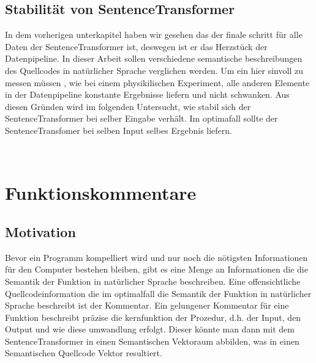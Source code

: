 \documentclass[12pt,letterpaper,ngerman]{article}
\begin{document}
\subsection{Stabilität von SentenceTransformer}
In dem vorherigen unterkapitel haben wir gesehen das der finale schritt 
für alle Daten der SentenceTransformer ist, deswegen ist er das Herzstück
der Datenpipeline. In dieser Arbeit sollen verschiedene semantische 
beschreibungen des Quellcodes in natürlicher Sprache verglichen werden.
Um ein hier sinvoll zu messen müssen , wie bei einem physikilischen Experiment,
alle anderen Elemente in der Datenpipeline konstante Ergebnisse liefern und 
nicht schwanken. Aus diesen Gründen wird im folgenden Untersucht, wie stabil
sich der SentenceTransformer bei selber Eingabe verhält. Im optimafall sollte
der SentenceTransfomer bei selben Input selbes Ergebnis liefern. 



\
\section{Funktionskommentare}
\subsection{Motivation}
Bevor ein Programm kompelliert wird und nur noch die nötigsten Informationen
für den Computer bestehen bleiben, gibt es eine Menge an Informationen die 
die Semantik der Funktion in natürlicher Sprache beschreiben. Eine offensichtliche
Quellcodeinformation die im optimalfall die Semantik der Funktion in natürlicher
Sprache beschreibt ist der Kommentar. Ein gelungener Kommentar für eine Funktion
beschreibt präzise die kernfunktion der Prozedur, d.h. der Input, den Output
und wie diese umwandlung erfolgt. Dieser könnte man dann mit dem 
SentenceTransformer in einen Semantischen Vektoraum abbilden, was in einen
Semantischen Quellcode Vektor resultiert.
\end{document}
